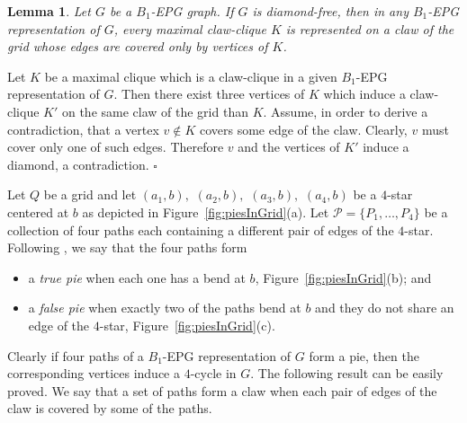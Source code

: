 \documentclass[9pt]{entcs}
\newtheorem{lema}[thm]{Lemma}%
\newtheorem{defi}[thm]{Definition}%
\begin{document}


\begin{lema}\label{lem:b1epgDiamondFree}
Let $G$ be a $B_1$-EPG graph. If $G$ is diamond-free, then in any $B_1$-EPG representation of $G$,  every maximal claw-clique $K$ is represented on a claw of the grid whose edges are covered only by vertices of $K$.
\end{lema}

\begin{pf}Let $K$ be a maximal clique which is a claw-clique in a given $B_1$-EPG representation of $G$. Then there exist three vertices of $K$ which induce a claw-clique $K'$ on
the same claw of the grid than $K$. Assume, in order to derive a contradiction, that a vertex $v\notin K$ covers some edge of the claw. Clearly, $v$ must  cover
only one of such edges. Therefore $v$ and the vertices of $K'$ induce a diamond, a contradiction. \hfill $\square$
\end{pf}



Let $ Q $ be a grid and let $ (a_1, b),$ $(a_2, b),$ $(a_3, b),$ $(a_4, b)$ be a $4$-star centered at $b$ as depicted in Figure~\ref{fig:piesInGrid}(a). Let $ \mathcal{P} = \{P_1, \dots , P_4\}$ be a collection of four paths each containing a different pair of edges of the $4$-star.
Following \cite{golumbic2009}, we say that the four paths form
\begin{itemize}
\item a \emph{true pie} %
when each one has a bend at $b$, Figure~\ref{fig:piesInGrid}(b); and 
\item a \emph {false pie} when exactly two of the paths %
bend at $b$ and they do not share an edge of the $4$-star, Figure~\ref{fig:piesInGrid}(c). %



\end{itemize}

Clearly if four paths of a $B_1$-EPG representation of $G$ form a pie, then the corresponding vertices induce a $4$-cycle in $G$. %
The following result can be easily proved. We say that a set of paths form a claw when each pair of edges of the claw is covered by some of the paths.
\end{document}
